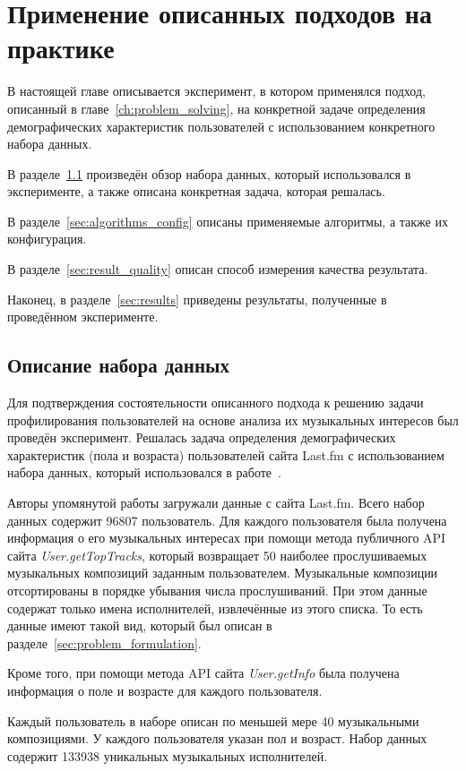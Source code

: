 \chapter{Применение описанных подходов на практике}

В настоящей главе описывается эксперимент, в котором применялся
подход, описанный в главе~\ref{ch:problem_solving}, на
конкретной задаче определения демографических характеристик
пользователей с использованием конкретного набора данных.

В разделе~\ref{sec:dataset} произведён обзор набора данных,
который использовался в эксперименте, а также описана
конкретная задача, которая решалась.

В разделе~\ref{sec:algorithms_config} описаны применяемые
алгоритмы, а также их конфигурация.

В разделе~\ref{sec:result_quality} описан способ измерения
качества результата.

Наконец, в разделе~\ref{sec:results} приведены результаты,
полученные в проведённом эксперименте.

\section{Описание набора данных}
\label{sec:dataset}

Для подтверждения состоятельности описанного подхода к решению задачи
профилирования пользователей на основе анализа их музыкальных
интересов был проведён эксперимент. Решалась задача определения
демографических характеристик (пола и возраста) пользователей сайта 
Last.fm с использованием набора данных, который использовался в
работе~\cite{wu2014gender}.

Авторы упомянутой работы загружали данные с сайта Last.fm. Всего набор
данных содержит 96807 пользователь. Для каждого пользователя была
получена информация о его музыкальных интересах при помощи метода
публичного API сайта \textit{User.getTopTracks}, который возвращает
50 наиболее прослушиваемых музыкальных композиций заданным пользователем. 
Музыкальные композиции отсортированы в порядке убывания числа прослушиваний.
При этом данные содержат только имена исполнителей, извлечённые из этого списка.
То есть данные имеют такой вид, который был описан в 
разделе~\ref{sec:problem_formulation}. 

Кроме того, при помощи метода API сайта \textit{User.getInfo}
была получена информация о поле и возрасте для каждого пользователя.

Каждый пользователь в наборе описан по меньшей мере 40
музыкальными композициями. У каждого пользователя указан пол и возраст.
Набор данных содержит 133938 уникальных музыкальных исполнителей.


